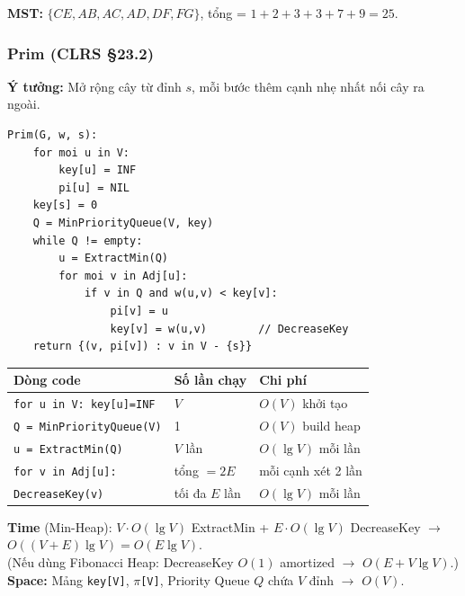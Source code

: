 \documentclass[10pt]{article}
\begin{document}
\textbf{MST:} $\{CE, AB, AC, AD, DF, FG\}$, tổng = $1+2+3+3+7+9 = \boxed{25}$.

\subsubsection{\texorpdfstring{Prim (CLRS
\S 23.2)}{Prim (CLRS 23.2)}}\label{prim-clrs-23.2}

\textbf{Ý tưởng:} Mở rộng cây từ đỉnh \(s\), mỗi bước thêm cạnh nhẹ nhất
nối cây ra ngoài.

\begin{tcolorbox}[colback=gray!8, colframe=gray!50, boxrule=0.5pt, arc=2pt,
  left=6pt, right=6pt, top=4pt, bottom=4pt,
  title={\small\textbf{Pseudocode 14: Prim's Algorithm}}]
\begin{verbatim}
Prim(G, w, s):
    for moi u in V:
        key[u] = INF
        pi[u] = NIL
    key[s] = 0
    Q = MinPriorityQueue(V, key)
    while Q != empty:
        u = ExtractMin(Q)
        for moi v in Adj[u]:
            if v in Q and w(u,v) < key[v]:
                pi[v] = u
                key[v] = w(u,v)        // DecreaseKey
    return {(v, pi[v]) : v in V - {s}}
\end{verbatim}
\end{tcolorbox}

\begin{tcolorbox}[colback=yellow!5, colframe=orange!50, boxrule=0.5pt, arc=2pt, title={\small\textbf{Phân tích Complexity -- Prim's Algorithm}}]
\begin{tabular}{|l|l|l|}
\hline
\textbf{Dòng code} & \textbf{Số lần chạy} & \textbf{Chi phí} \\
\hline
\texttt{for u in V: key[u]=INF} & $V$ & $O(V)$ khởi tạo \\
\hline
\texttt{Q = MinPriorityQueue(V)} & 1 & $O(V)$ build heap \\
\hline
\texttt{u = ExtractMin(Q)} & $V$ lần & $O(\lg V)$ mỗi lần \\
\hline
\texttt{for v in Adj[u]:} & tổng $= 2E$ & mỗi cạnh xét 2 lần \\
\hline
\quad \texttt{DecreaseKey(v)} & tối đa $E$ lần & $O(\lg V)$ mỗi lần \\
\hline
\end{tabular}
\vspace{0.2cm}

\textbf{Time} (Min-Heap): $V \cdot O(\lg V)$ ExtractMin + $E \cdot O(\lg V)$ DecreaseKey $\to$ $O((V+E)\lg V) = O(E\lg V)$.\\
{\small (Nếu dùng Fibonacci Heap: DecreaseKey $O(1)$ amortized $\to$ $O(E + V\lg V)$.)}\\
\textbf{Space:} Mảng \texttt{key[V]}, \texttt{$\pi$[V]}, Priority Queue $Q$ chứa $V$ đỉnh $\to$ $O(V)$.
\end{tcolorbox}
\end{document}

